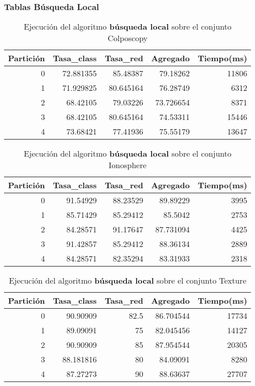 \documentclass[size=a4, parskip=half, titlepage=false, toc=flat, toc=bib, 12pt]{scrartcl}
\begin{document}
\newpage

\subsubsection{Tablas Búsqueda Local}

 \begin{table}[ht]
  \centering
  \begin{tabular}[t]{rrrrr}
  \toprule
  Partición &Tasa\_class &Tasa\_red & Agregado & Tiempo(ms)\\
  \midrule
0         & 72.881355 & 85.48387  & 79.18262  & 11806  \\
1         & 71.929825 & 80.645164 & 76.28749  & 6312   \\
2         & 68.42105  & 79.03226  & 73.726654 & 8371   \\
3         & 68.42105  & 80.645164 & 74.53311  & 15446  \\
4         & 73.68421  & 77.41936  & 75.55179  & 13647  \\
  \bottomrule
  \end{tabular}
  \caption{Ejecución del algoritmo \textbf{búsqueda local} sobre el conjunto Colposcopy }
  \end{table}%

 \begin{table}[ht]
  \centering
  \begin{tabular}[t]{rrrrr}
  \toprule
  Partición &Tasa\_class &Tasa\_red & Agregado & Tiempo(ms)\\
  \midrule
0         & 91.54929  & 88.23529 & 89.89229  & 3995   \\
1         & 85.71429  & 85.29412 & 85.5042   & 2753   \\
2         & 84.28571  & 91.17647 & 87.731094 & 4425   \\
3         & 91.42857  & 85.29412 & 88.36134  & 2889   \\
4         & 84.28571  & 82.35294 & 83.31933  & 2318   \\
  \bottomrule
  \end{tabular}
  \caption{Ejecución del algoritmo \textbf{búsqueda local} sobre el conjunto Ionosphere}
  \end{table}%

 \begin{table}[ht]
  \centering
  \begin{tabular}[t]{rrrrr}
  \toprule
  Partición &Tasa\_class &Tasa\_red & Agregado & Tiempo(ms)\\
  \midrule
0         & 90.90909  & 82.5     & 86.704544 & 17734  \\
1         & 89.09091  & 75       & 82.045456 & 14127  \\
2         & 90.90909  & 85       & 87.954544 & 20305  \\
3         & 88.181816 & 80       & 84.09091  & 8280   \\
4         & 87.27273  & 90       & 88.63637  & 27707  \\
\bottomrule
  \end{tabular}
  \caption{Ejecución del algoritmo \textbf{búsqueda local} sobre el conjunto Texture}
  \end{table}%
\end{document}
